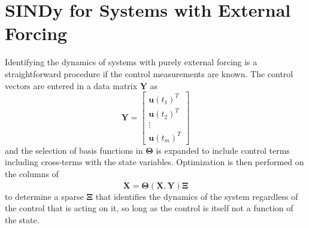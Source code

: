 \documentclass[%
 aip,12pt,
rsi,%
 amsmath,amssymb,
 reprint,%
]{revtex4-1}
\begin{document}
{\section{SINDy for Systems with External Forcing\label{ext}}
Identifying the dynamics of systems with purely external forcing is a straightforward procedure if the control measurements are known. The control vectors are entered in a data matrix $\bm{Y}$ as
\begin{equation}
  \bm{Y} = 
    \begin{bmatrix}
      \bm{u}(t_1)^T \\ \bm{u}(t_2)^T \\ \vdots \\ \bm{u}(t_m)^T
    \end{bmatrix}
\end{equation}
and the selection of basis functions in $\bm{\Theta}$ is expanded to include control terms including cross-terms with the state variables. Optimization is then performed on the columns of 
\begin{equation} \label{control}
    \bm{\dot{X}} = \bm{\Theta}(\bm{X},\bm{Y})\bm{\Xi}
\end{equation}
to determine a sparse $\bm{\Xi}$ that identifies the dynamics of the system regardless of the control that is acting on it, so long as the control is itself not a function of the state.

}
\end{document}
